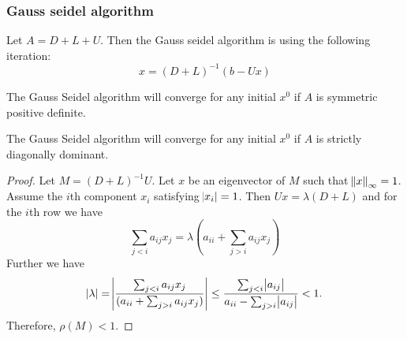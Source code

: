 \begin{refsection}
\subsubsection{Gauss seidel algorithm}
\begin{definition}
	Let $A = D + L + U$. Then the Gauss seidel algorithm is using the following iteration:
	$$x = (D + L)^{-1}(b - Ux)$$
\end{definition}

\begin{lemma}\cite[615]{golub2013matrix}
	The Gauss Seidel algorithm will converge for any initial $x^0$ if $A$ is symmetric positive definite.
\end{lemma}


\begin{lemma}\cite[122]{saad2003iterative}
	The Gauss Seidel algorithm will converge for any initial $x^0$ if $A$ is strictly diagonally dominant.
\end{lemma}
\begin{proof}
Let $M = (D+L)^{-1}U$. 
Let $x$ be an eigenvector of $M$ such that $\norm{x}_\infty = 1$. Assume the $i$th component $x_i$ satisfying $\abs{x_i} = 1$. Then
$Ux = \lambda(D+L)$ and for the $i$th row we have $$\sum_{j<i} a_{ij}x_j  = \lambda(a_{ii} + \sum_{j>i} a_{ij}x_j)$$
Further we have
$$\abs{\lambda} = \abs{\frac{\sum_{j<i} a_{ij}x_j}{(a_{ii} + \sum_{j>i} a_{ij}x_j)}} \leq \frac{\sum_{j<i} \abs{a_{ij}}}{a_{ii} - \sum_{j>i} \abs{a_{ij}}} <1.$$
Therefore, $\rho(M) < 1$.
\end{proof}



\end{refsection}
